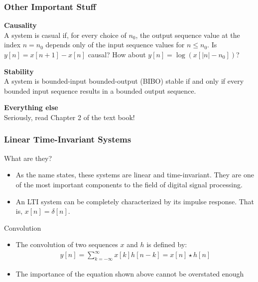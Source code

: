 \documentclass[mathserif,9pt]{beamer}
\begin{document}
\begin{frame}\frametitle{Other Important Stuff}\small
  {\bf\color{blue!50!black}Causality} \\
  A system is casual if, for every choice of $n_0$, the output sequence value at the index $n=n_0$ depends only of the input sequence values for $n \leq n_0$. Is $y[n] = x[n+1] - x[n]$ causal? How about $y[n] = \log(x[|n| - n_0])$?\\
  \vspace{1em}
  
  {\bf\color{blue!50!black}Stability} \\
  A system is bounded-input bounded-output (BIBO) stable if and only if  every bounded input sequence results in a bounded output sequence. 
  \vspace{1em}
  
  {\bf\color{blue!50!black}Everything else} \\
  Seriously, read Chapter 2 of the text book!
\end{frame}


\begin{frame}\frametitle{Linear Time-Invariant Systems}\small
  \begin{block}{What are they?}
    \begin{itemize}
      \item As the name states, these systems are linear and time-invariant. They are one of the most important components to the field of digital signal processing. 
      \item An LTI system can be completely characterized by its impulse response. That is, $x[n] = \delta[n]$.
    \end{itemize}
  \end{block}
  
  \begin{exampleblock}{Convolution}
    \begin{itemize}
      \item The convolution of two sequences $x$ and $h$ is defined by:
        \begin{align}
          y[n] = \sum_{k=-\infty}^{\infty} x[k] h[n-k]  = x[n] \star h[n] \nonumber
        \end{align}
      \item The importance of the equation shown above cannot be overstated enough 
    \end{itemize}
  \end{exampleblock}
\end{frame}
\end{document}
